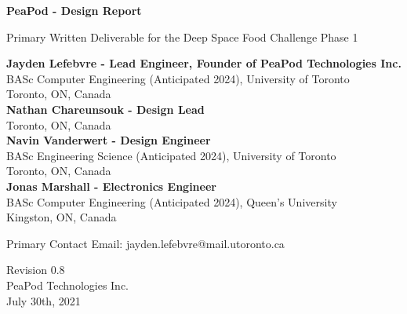 \documentclass{report}
\begin{document}
\begin{titlepage}
    \begin{center}
        \vspace*{1.2cm}

        \textbf{\large{PeaPod - Design Report}}

        \vspace{0.5cm}

        Primary Written Deliverable for the Deep Space Food Challenge Phase 1

        \vfill \small{

            \textbf{Jayden Lefebvre - Lead Engineer, Founder of PeaPod Technologies Inc.}\\
            BASc Computer Engineering (Anticipated 2024), University of Toronto\\
            Toronto, ON, Canada\\
            \vspace{.5cm}
            \textbf{Nathan Chareunsouk - Design Lead}\\Toronto, ON, Canada\\
            \vspace{.5cm}
            \textbf{Navin Vanderwert - Design Engineer}\\
            BASc Engineering Science (Anticipated 2024), University of Toronto\\
            Toronto, ON, Canada\\
            \vspace{.5cm}
            \textbf{Jonas Marshall - Electronics Engineer}\\
            BASc Computer Engineering (Anticipated 2024), Queen's University\\
            Kingston, ON, Canada

        }

        \vspace{1cm}

        Primary Contact Email: jayden.lefebvre@mail.utoronto.ca

        \vspace{.75cm}

        Revision 0.8\\
        PeaPod Technologies Inc.\\
        July 30th, 2021

    \end{center}
\end{titlepage}

\thispagestyle{plain}
\end{document}
